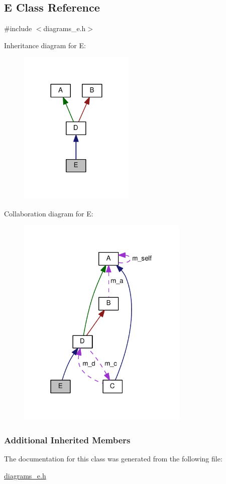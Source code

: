 \hypertarget{class_e}{}\subsection{E Class Reference}
\label{class_e}


{\ttfamily \#include $<$diagrams\+\_\+e.\+h$>$}



Inheritance diagram for E\+:
\nopagebreak
\begin{figure}[H]
\begin{center}
\leavevmode
\includegraphics[width=156pt]{class_e__inherit__graph}
\end{center}
\end{figure}


Collaboration diagram for E\+:
\nopagebreak
\begin{figure}[H]
\begin{center}
\leavevmode
\includegraphics[width=232pt]{class_e__coll__graph}
\end{center}
\end{figure}
\subsubsection*{Additional Inherited Members}


The documentation for this class was generated from the following file\+:\begin{DoxyCompactItemize}
\item 
\hyperlink{diagrams__e_8h}{diagrams\+\_\+e.\+h}\end{DoxyCompactItemize}
